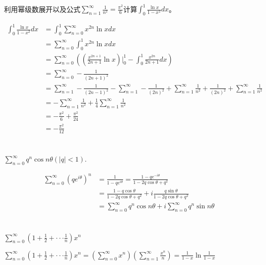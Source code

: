     \begin{example}
    \hfill\\
  利用幂级数展开以及公式$\displaystyle\sum_{n=1}^{\infty}\frac1{n^2}=\frac{\pi^2}6$计算$\int_0^1\frac{\ln x}{1-x^2}dx$。    
    
    
  \begin{equation}
  \begin{aligned}
  \int_0^1\frac{\ln x}{1-x^2}dx&=\int_0^1\sum_{n=0}^{\infty}x^{2n}\ln xdx\\
  &=\sum_{n=0}^{\infty}\int_0^1x^{2n}\ln xdx\\
  &=\sum_{n=0}^{\infty}((\frac{x^{2n+1}}{2n+1}\ln x)|_0^1-\int_0^1\frac{x^{2n}}{2n+1}dx)\\
  &=\sum_{n=0}^{\infty}-\frac{1}{(2n+1)^2}\\
  &=\sum_{n=1}^{\infty}-\frac{1}{(2n-1)^2}-\sum_{n=1}^{\infty}-\frac{1}{(2n)^2}+\sum_{n=1}^{\infty}\frac{1}{n^2}+\frac{1}{(2n)^2}+\sum_{n=1}^{\infty}\frac{1}{n^2}\\
  &=-\sum_{n=1}^{\infty}\frac{1}{n^2}+\frac{1}{4}\sum_{n=1}^{\infty}\frac{1}{n^2}\\
  &=-\frac{\pi^2}6+\frac{\pi^2}{24}\\
  &=-\frac{\pi^2}{12}\\
  \end{aligned}
  \end{equation}   
    
    \end{example}  
    \begin{example}
    \hfill\\
  $\displaystyle\sum_{n=0}^{\infty}q^n\cos n\theta(|q|<1)$.    
    
    
  \begin{align*}
  \sum_{n=0}^{\infty}(qe^{i\theta})^n&=\frac{1}{1-qe^{i\theta}}=\frac{1-qe^{-i\theta}}{1-2q\cos\theta+q^2}\\
  &=\frac{1-q\cos\theta}{1-2q\cos\theta+q^2}+i\frac{q\sin\theta}{1-2q\cos\theta+q^2}\\
  &=\sum_{n=0}^{\infty}q^n\cos n\theta+i\sum_{n=0}^{\infty}q^n\sin n\theta\\
  \end{align*}    
    
    \end{example}  
     \begin{example}
    \hfill\\
$\displaystyle\sum_{n=0}^{\infty}(1+\frac12+\cdot\cdot\cdot\frac1n)x^n$
    
   $\displaystyle\sum_{n=0}^{\infty}(1+\frac12+\cdot\cdot\cdot\frac1n)x^n=(\sum_{n=0}^{\infty}x^n)(\sum_{n=1}^{\infty}\frac{x^n}n)=\frac1{1-x}\ln\frac1{1-x}$   
        
    
    \end{example} 
  \hfill\\
  
